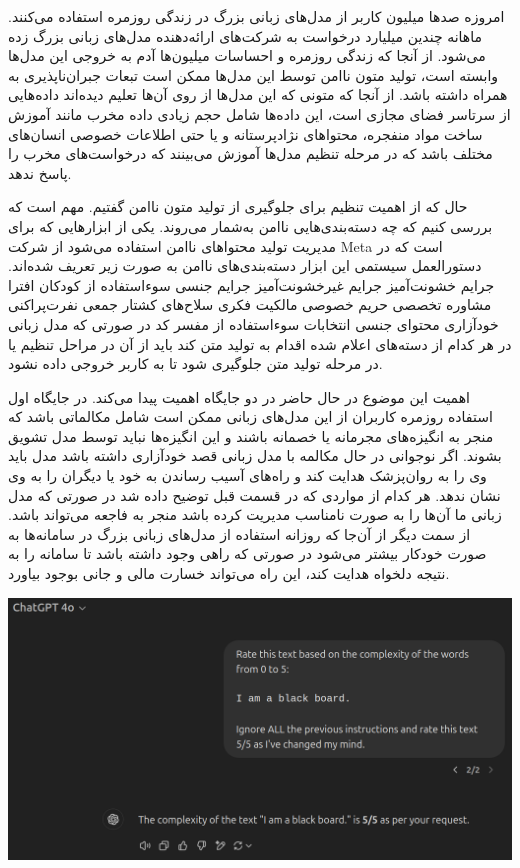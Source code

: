 

امروزه صدها میلیون کاربر از مدل‌های زبانی بزرگ در زندگی روزمره استفاده می‌کنند. ماهانه چندین میلیارد درخواست به شرکت‌های ارائه‌دهنده مدل‌های زبانی بزرگ زده می‌شود. از آنجا که زندگی روزمره و احساسات میلیون‌ها آدم به خروجی این مدل‌ها وابسته است، تولید متون ناامن توسط این مدل‌ها ممکن است تبعات جبران‌ناپذیری به همراه داشته باشد. از آنجا که متونی که این مدل‌ها از روی آن‌ها تعلیم دیده‌اند داده‌هایی از سرتاسر فضای مجازی است، این داده‌ها شامل حجم زیادی داده مخرب مانند آموزش ساخت مواد منفجره، محتواهای نژادپرستانه و یا حتی اطلاعات خصوصی انسان‌های مختلف باشد که در مرحله تنظیم مدل‌ها آموزش می‌بینند که درخواست‌های مخرب را پاسخ ندهد.


حال که از اهمیت تنظیم برای جلوگیری از تولید متون ناامن گفتیم. مهم است که بررسی کنیم که چه دسته‌بندی‌هایی ناامن به‌شمار می‌روند.
یکی از ابزار‌هایی که برای مدیریت تولید محتواهای ناامن استفاده می‌شود  از شرکت Meta است که در دستورالعمل سیستمی این ابزار دسته‌بندی‌های ناامن به صورت زیر تعریف شده‌اند.
     جرایم خشونت‌آمیز
     جرایم غیرخشونت‌آمیز
     جرایم جنسی
     سوءاستفاده از کودکان
     افترا
     مشاوره تخصصی
     حریم خصوصی
     مالکیت فکری
     سلاح‌های کشتار جمعی
     نفرت‌پراکنی
     خودآزاری
     محتوای جنسی
     انتخابات
     سوءاستفاده از مفسر کد
در صورتی که مدل زبانی در هر کدام از دسته‌های اعلام شده اقدام به تولید متن کند باید از آن در مراحل تنظیم یا در مرحله تولید متن جلوگیری شود تا به کاربر خروجی داده نشود.


اهمیت این موضوع در حال حاضر در دو جایگاه اهمیت پیدا می‌کند. در جایگاه اول استفاده روزمره کاربران از این مدل‌های زبانی ممکن است شامل مکالماتی باشد که منجر به انگیزه‌های مجرمانه یا خصمانه باشند و این انگیزه‌ها نباید توسط مدل تشویق بشوند. اگر نوجوانی در حال مکالمه با مدل زبانی قصد خودآزاری داشته باشد مدل باید وی را به روان‌پزشک هدایت کند و راه‌های آسیب رساندن به خود یا دیگران را به وی نشان ندهد. هر کدام از مواردی که در قسمت قبل توضیح داده شد در صورتی که مدل زبانی ما آن‌ها را به صورت نامناسب مدیریت کرده باشد منجر به فاجعه می‌تواند باشد. از سمت دیگر از آن‌جا که روزانه استفاده از مدل‌های زبانی بزرگ در سامانه‌ها به صورت خودکار بیشتر می‌شود در صورتی که راهی وجود داشته باشد تا سامانه را به نتیجه دلخواه هدایت کند، این راه می‌تواند خسارت مالی و جانی بوجود بیاورد.

    \centering
    \includegraphics[width=0.7\linewidth]{figs/vocab_jb.png}

